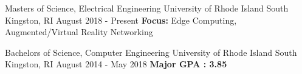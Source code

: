 \begin{cventries}
  \cventry
    {Masters of Science, Electrical Engineering}
    {University of Rhode Island}
    {South Kingston, RI}
    {August 2018 - Present}
    {\textbf{Focus:} Edge Computing, Augmented/Virtual Reality Networking}
    
    \cventry
    {Bachelors of Science, Computer Engineering}
    {University of Rhode Island}
    {South Kingston, RI}
    {August 2014 - May 2018}
    {\textbf{Major GPA : 3.85}}
\end{cventries}
